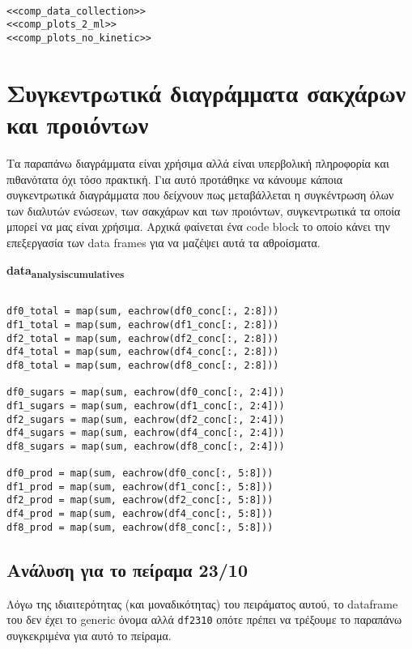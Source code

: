 \documentclass[11pt]{article}
\begin{document}
\begin{verbatim}

<<comp_data_collection>>
<<comp_plots_2_ml>>
<<comp_plots_no_kinetic>>

\end{verbatim}

\section{Συγκεντρωτικά διαγράμματα σακχάρων και προιόντων}
\label{sec:org0a0daa6}
Τα παραπάνω διαγράμματα είναι χρήσιμα αλλά είναι υπερβολική πληροφορία και πιθανότατα όχι τόσο πρακτική. Για αυτό προτάθηκε να κάνουμε κάποια συγκεντρωτικά διαγράμματα που δείχνουν πως μεταβάλλεται η συγκέντρωση όλων των διαλυτών ενώσεων, των σακχάρων και των προιόντων, συγκεντρωτικά τα οποία μπορεί να μας είναι χρήσιμα. Αρχικά φαίνεται ένα code block το οποίο κάνει την επεξεργασία των data frames για να μαζέψει αυτά τα αθροίσματα.

\textbf{data\textsubscript{analysis}\textsubscript{cumulatives}}
\begin{verbatim}

df0_total = map(sum, eachrow(df0_conc[:, 2:8]))
df1_total = map(sum, eachrow(df1_conc[:, 2:8]))
df2_total = map(sum, eachrow(df2_conc[:, 2:8]))
df4_total = map(sum, eachrow(df4_conc[:, 2:8]))
df8_total = map(sum, eachrow(df8_conc[:, 2:8]))

df0_sugars = map(sum, eachrow(df0_conc[:, 2:4]))
df1_sugars = map(sum, eachrow(df1_conc[:, 2:4]))
df2_sugars = map(sum, eachrow(df2_conc[:, 2:4]))
df4_sugars = map(sum, eachrow(df4_conc[:, 2:4]))
df8_sugars = map(sum, eachrow(df8_conc[:, 2:4]))

df0_prod = map(sum, eachrow(df0_conc[:, 5:8]))
df1_prod = map(sum, eachrow(df1_conc[:, 5:8]))
df2_prod = map(sum, eachrow(df2_conc[:, 5:8]))
df4_prod = map(sum, eachrow(df4_conc[:, 5:8]))
df8_prod = map(sum, eachrow(df8_conc[:, 5:8]))

\end{verbatim}

\subsection{Ανάλυση για το πείραμα 23/10}
\label{sec:orgde5ac98}
Λόγω της ιδιαιτερότητας (και μοναδικότητας) του πειράματος αυτού, το dataframe του δεν έχει το generic όνομα αλλά \texttt{df2310} οπότε πρέπει να τρέξουμε το παραπάνω συγκεκριμένα για αυτό το πείραμα.
\end{document}
